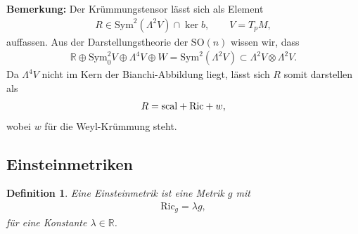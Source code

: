 \documentclass[12pt,a4paper]{article}
\def\R{\mathbb{R}}
\def\SO{\mathrm{SO}}
\def\Sym{\mathrm{Sym}}
\def\Ric{\mathrm{Ric}}
\newtheorem{Definition}[Lemma]{Definition}
\begin{document}
\bigskip

{\bf Bemerkung:}
Der Kr\"ummungstensor l\"asst sich als Element
\begin{align*}
R \in \Sym^2(\Lambda^2V)\cap\ker b,\qquad V =T_pM,
\end{align*}
auffassen. Aus der Darstellungstheorie der $\SO(n)$ wissen wir, dass
\begin{align*}
\R\oplus \Sym_0^2V \oplus \Lambda^4V \oplus W = \Sym^2(\Lambda^2V) \subset
\Lambda^2 V\otimes \Lambda^2 V.
\end{align*}
Da $\Lambda^4 V$ nicht im Kern der Bianchi-Abbildung
liegt, l\"asst sich $R$ somit darstellen als
\begin{align*}
R = \scal + \Ric + w,
\end{align*}
wobei $w$ f\"ur die Weyl-Kr\"ummung steht.

\subsection{Einsteinmetriken}

\begin{Definition}
Eine \emph{Einsteinmetrik} ist eine Metrik $g$ mit
\begin{align*}
\Ric_g = \lambda g,
\end{align*}
f\"ur eine Konstante $\lambda\in\R$.
\end{Definition}
\end{document}
